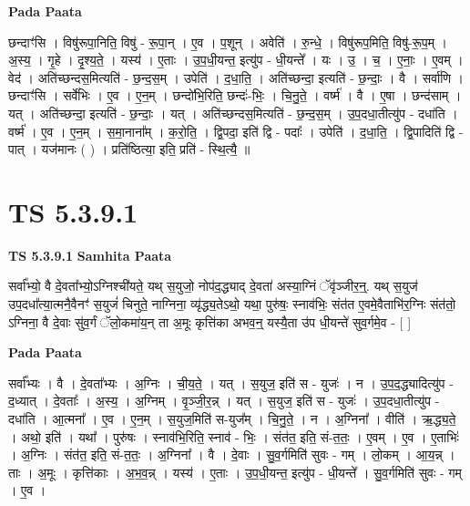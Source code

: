 \documentclass[17pt]{extarticle}
\begin{document}
\textbf{Pada Paata} \newline

छन्दाꣳ॑सि । विषु॑रूपा॒निति॒ विषु॑ - रू॒पा॒न् । ए॒व । प॒शून् । अवेति॑ । रु॒न्धे॒ । विषु॑रूप॒मिति॒ विषु॑-रू॒प॒म् । अ॒स्य॒ । गृ॒हे । दृ॒श्य॒ते॒ । यस्य॑ । ए॒ताः । उ॒प॒धी॒यन्त॒ इत्यु॑प - धी॒यन्ते᳚ । यः । उ॒ । च॒ । ए॒नाः॒ । ए॒वम् । वेद॑ । अति॑च्छन्दस॒मित्यति॑ - छ॒न्द॒स॒म् । उपेति॑ । द॒धा॒ति॒ । अति॑च्छन्दा॒ इत्यति॑ - छ॒न्दाः॒ । वै । सर्वा॑णि । छन्दाꣳ॑सि । सर्वे॑भिः । ए॒व । ए॒न॒म् । छन्दो॑भि॒रिति॒ छन्दः॑-भिः॒ । चि॒नु॒ते॒ । वर्ष्म॑ । वै । ए॒षा । छन्द॑साम् । यत् । अति॑च्छन्दा॒ इत्यति॑ - छ॒न्दाः॒ । यत् । अति॑च्छन्दस॒मित्यति॑ - छ॒न्द॒स॒म् । उ॒प॒दधा॒तीत्यु॑प - दधा॑ति । वर्ष्म॑ । ए॒व । ए॒न॒म् । स॒मा॒नाना᳚म् । क॒रो॒ति॒ । द्वि॒पदा॒ इति॑ द्वि - पदाः᳚ । उपेति॑ । द॒धा॒ति॒ । द्वि॒पादिति॑ द्वि - पात् । यज॑मानः ( ) । प्रति॑ष्ठित्या॒ इति॒ प्रति॑ - स्थि॒त्यै॒ ॥  \newline




\section*{ TS 5.3.9.1 }

\textbf{TS 5.3.9.1 } \newline
\textbf{Samhita Paata} \newline

सर्वा᳚भ्यो॒ वै दे॒वता᳚भ्यो॒ऽग्निश्ची॑यते॒ यथ् स॒युजो॒ नोप॑द॒द्ध्याद् दे॒वता॑ अस्या॒ग्निं ॅवृ॑ञ्जीर॒न्॒. यथ् स॒युज॑ उप॒दधा᳚त्या॒त्मनै॒वैनꣳ॑ स॒युजं॑ चिनुते॒ नाग्निना॒ व्यृ॑द्ध्य॒तेऽथो॒ यथा॒ पुरु॑षः॒ स्नाव॑भिः॒ संत॑त ए॒वमे॒वैताभि॑र॒ग्निः संत॑तो॒ ऽग्निना॒ वै दे॒वाः सु॑व॒र्गं ॅलो॒कमा॑य॒न् ता अ॒मूः कृत्ति॑का अभव॒न्॒ यस्यै॒ता उ॑प धी॒यन्ते॑ सुव॒र्गमे॒व - [  ] \newline

\textbf{Pada Paata} \newline

सर्वा᳚भ्यः । वै । दे॒वता᳚भ्यः । अ॒ग्निः । ची॒य॒ते॒ । यत् । स॒युज॒ इति॑ स - युजः॑ । न । उ॒प॒द॒द्ध्यादित्यु॑प - द॒ध्यात् । दे॒वताः᳚ । अ॒स्य॒ । अ॒ग्निम् । वृ॒ञ्जी॒र॒न्न् । यत् । स॒युज॒ इति॑ स - युजः॑ । उ॒प॒दधा॒तीत्यु॑प - दधा॑ति । आ॒त्मना᳚ । ए॒व । ए॒न॒म् । स॒युज॒मिति॑ स-युज᳚म् । चि॒नु॒ते॒ । न । अ॒ग्निना᳚ । वीति॑ । ऋ॒द्ध्य॒ते॒ । अथो॒ इति॑ । यथा᳚ । पुरु॑षः । स्नाव॑भि॒रिति॒ स्नाव॑ - भिः॒ । संत॑त॒ इति॒ सं-त॒तः॒ । ए॒वम् । ए॒व । ए॒ताभिः॑ । अ॒ग्निः । संत॑त॒ इति॒ सं-त॒तः॒ । अ॒ग्निना᳚ । वै । दे॒वाः । सु॒व॒र्गमिति॑ सुवः - गम् । लो॒कम् । आ॒य॒न्न् । ताः । अ॒मूः । कृत्ति॑काः । अ॒भ॒व॒न्न् । यस्य॑ । ए॒ताः । उ॒प॒धी॒यन्त॒ इत्यु॑प - धी॒यन्ते᳚ । सु॒व॒र्गमिति॑ सुवः - गम् । ए॒व ।  \newline
\end{document}
